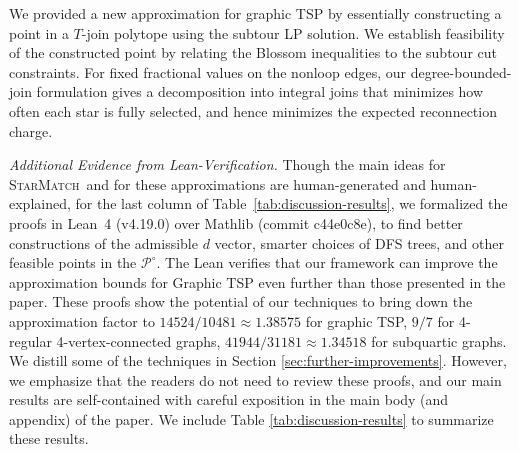 \documentclass[11pt]{amsart}
\newcommand{\1}{\mathbbm{1}}
\newcommand{\ALG}{\textsc{StarMatch}}
\begin{document}
{We provided a new approximation for graphic TSP by
essentially constructing a point in a $T$-join polytope
using the subtour LP solution. We establish feasibility of the constructed point 
by relating the Blossom inequalities to the subtour cut
constraints. For fixed fractional values on the nonloop
edges, our degree-bounded-join formulation gives a decomposition
into integral joins that minimizes how often each star is
fully selected, and hence minimizes the expected reconnection
charge. }





\noindent 
{\it Additional Evidence from Lean-Verification.} Though the main ideas for \ALG\  and for these approximations are human-generated and human-explained,
for the last column of Table~\ref{tab:discussion-results}, we formalized the proofs in Lean~4 (v4.19.0) over Mathlib (commit c44e0c8e), to find better constructions of the admissible $d$ vector, smarter choices of DFS trees, and other feasible points in the $\mathcal{P}^\circ$. The Lean verifies that our framework can improve the approximation bounds for Graphic TSP even further than those presented in the paper. These proofs show the potential of our techniques to bring down the approximation factor to $14524/10481\approx1.38575$ for graphic TSP, $9/7$ for 4-regular 4-vertex-connected graphs, $41944/31181\approx1.34518$ for subquartic graphs. We distill some of the techniques in Section \ref{sec:further-improvements}. However, we emphasize that the readers do not need to review these proofs, and our main results are self-contained with careful exposition in the main body (and appendix) of the paper. We include Table \ref{tab:discussion-results} to summarize these results. 
\end{document}
